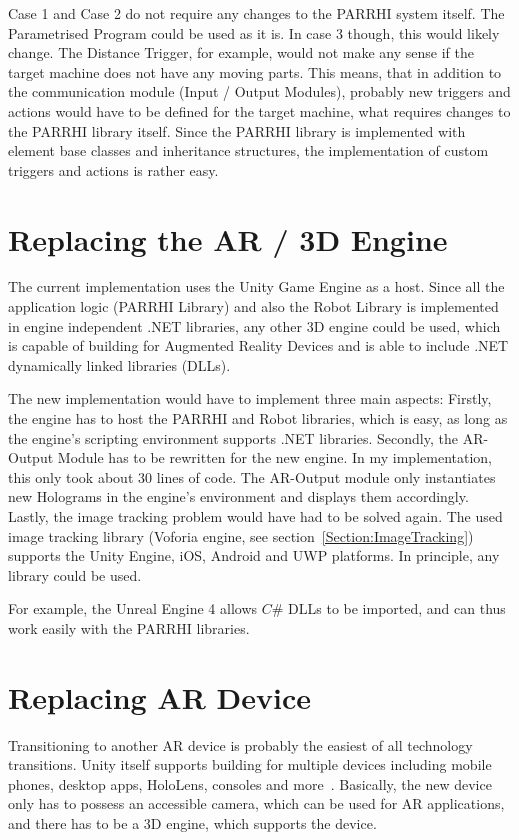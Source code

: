 Case 1 and Case 2 do not require any changes to the PARRHI system itself. The Parametrised Program could be used as it is. In case 3 though, this would likely change. The Distance Trigger, for example, would not make any sense if the target machine does not have any moving parts. This means, that in addition to the communication module (Input / Output Modules), probably new triggers and actions would have to be defined for the target machine, what requires changes to the PARRHI library itself. Since the PARRHI library is implemented with element base classes and inheritance structures, the implementation of custom triggers and actions is rather easy.

\section{Replacing the AR / 3D Engine}

The current implementation uses the Unity Game Engine as a host. Since all the application logic (PARRHI Library) and also the Robot Library is implemented in engine independent .NET libraries, any other 3D engine could be used, which is capable of building for Augmented Reality Devices and is able to include .NET dynamically linked libraries (DLLs). 

The new implementation would have to implement three main aspects: Firstly, the engine has to host the PARRHI and Robot libraries, which is easy, as long as the engine's scripting environment supports .NET libraries. Secondly, the AR-Output Module has to be rewritten for the new engine. In my implementation, this only took about 30 lines of code. The AR-Output module only instantiates new Holograms in the engine's environment and displays them accordingly. Lastly, the image tracking problem would have had to be solved again. The used image tracking library (Voforia engine, see section~\ref{Section:ImageTracking}) supports the Unity Engine, iOS, Android and UWP platforms. In principle, any library could be used.

For example, the Unreal Engine 4 \cite{unrealEngine} allows $C\#$ DLLs to be imported, and can thus work easily with the PARRHI libraries.

\section{Replacing AR Device}

Transitioning to another AR device is probably the easiest of all technology transitions. Unity itself supports building for multiple devices including mobile phones, desktop apps, HoloLens, consoles and more~\cite{UnityPlatforms}. Basically, the new device only has to possess an accessible camera, which can be used for AR applications, and there has to be a 3D engine, which supports the device. 